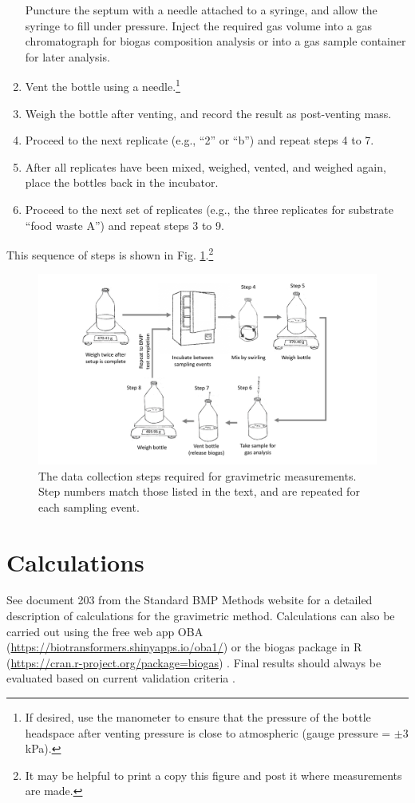 \documentclass[]{article}
\begin{document}
\begin{enumerate}
      Puncture the septum with a needle attached to a syringe, and allow the syringe to fill under pressure. 
      Inject the required gas volume into a gas chromatograph for biogas composition analysis or into a gas sample container for later analysis.
    \item Vent the bottle using a needle.\footnote{
      If desired, use the manometer to ensure that the pressure of the bottle headspace after venting pressure is close to atmospheric (gauge pressure = $\pm3$ kPa).
    }    
    \item Weigh the bottle after venting, and record the result as post-venting mass. 
    \item Proceed to the next replicate (e.g., ``2'' or ``b'') and repeat steps 4 to 7.
    \item After all replicates have been mixed, weighed, vented, and weighed again, place the bottles back in the incubator.
    \item Proceed to the next set of replicates (e.g., the three replicates for substrate ``food waste A'') and repeat steps 3 to 9.
\end{enumerate}

This sequence of steps is shown in Fig. \ref{fig:steps}.\footnote{It may be helpful to print a copy this figure and post it where measurements are made.}

\begin{figure}[ht]
  \includegraphics[width=\textwidth]{figs/grav_steps.pdf}
  \caption{The data collection steps required for gravimetric measurements. Step numbers match those listed in the text, and are repeated for each sampling event.}
  \label{fig:steps}
\end{figure}

\section{Calculations}
See document 203 from the Standard BMP Methods website \citep{BMPdoc203grav} for a detailed description of calculations for the gravimetric method.
Calculations can also be carried out using the free web app OBA (\url{https://biotransformers.shinyapps.io/oba1/}) or the biogas package in R (\url{https://cran.r-project.org/package=biogas}) \citep{hafnerSoftwareBiogasResearch2018}.
Final results should always be evaluated based on current validation criteria \citep{BMPdoc100req}.


\end{document}
